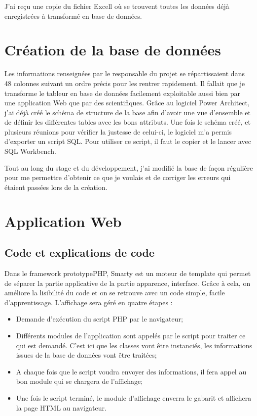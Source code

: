\documentclass[12pt,a4paper,titlepage,twoside]{report}
\begin{document}
J'ai reçu une copie du fichier Excell où se trouvent toutes les données déjà enregistrées à transformé en base de données.

\section{Création de la base de données}
Les informations renseignées par le responsable du projet se répartissaient dans 48 colonnes suivant un ordre précis pour les rentrer rapidement. Il fallait que je transforme le tableur en base de données facilement exploitable aussi bien par une application Web que par des scientifiques. Grâce au logiciel Power Architect, j'ai déjà créé le schéma de structure de la base afin d'avoir une vue d'ensemble et de définir les différentes tables avec les bons attributs. Une fois le schéma créé, et plusieurs réunions pour vérifier la justesse de celui-ci, le logiciel m'a permis d'exporter un script SQL. Pour utiliser ce script, il faut le copier et le lancer avec SQL Workbench. 

Tout au long du stage et du développement, j'ai modifié la base de façon régulière pour me permettre d'obtenir ce que je voulais et de corriger les erreurs qui étaient passées lors de la création.

\section{Application Web}
\subsection{Code et explications de code}
Dans le framework prototypePHP, Smarty est un moteur de template qui permet de séparer la partie applicative de la partie apparence, interface. Grâce à cela, on améliore la lisibilité du code et on se retrouve avec un code simple, facile d'apprentissage. L'affichage sera géré en quatre étapes : 
\begin{itemize}
\item Demande d'exécution du script PHP par le navigateur;
\item Différents modules de l'application sont appelés par le script pour traiter ce qui est demandé. C'est ici que les classes vont être instanciés, les informations issues de la base de données vont être traitées;
\item A chaque fois que le script voudra envoyer des informations, il fera appel au bon module qui se chargera de l'affichage;
\item Une fois le script terminé, le module d'affichage enverra le gabarit et affichera la page HTML au navigateur.\newline
\end{itemize}
\end{document}
